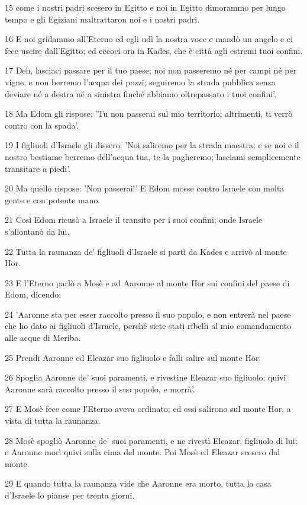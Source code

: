\par 15 come i nostri padri scesero in Egitto e noi in Egitto dimorammo per lungo tempo e gli Egiziani maltrattaron noi e i nostri padri.
\par 16 E noi gridammo all'Eterno ed egli udì la nostra voce e mandò un angelo e ci fece uscire dall'Egitto; ed eccoci ora in Kades, che è città agli estremi tuoi confini.
\par 17 Deh, lasciaci passare per il tuo paese; noi non passeremo né per campi né per vigne, e non berremo l'acqua dei pozzi; seguiremo la strada pubblica senza deviare né a destra né a sinistra finché abbiamo oltrepassato i tuoi confini'.
\par 18 Ma Edom gli rispose: 'Tu non passerai sul mio territorio; altrimenti, ti verrò contro con la spada'.
\par 19 I figliuoli d'Israele gli dissero: 'Noi saliremo per la strada maestra; e se noi e il nostro bestiame berremo dell'acqua tua, te la pagheremo; lasciami semplicemente transitare a piedi'.
\par 20 Ma quello rispose: 'Non passerai!' E Edom mosse contro Israele con molta gente e con potente mano.
\par 21 Così Edom ricusò a Israele il transito per i suoi confini; onde Israele s'allontanò da lui.
\par 22 Tutta la raunanza de' figliuoli d'Israele si partì da Kades e arrivò al monte Hor.
\par 23 E l'Eterno parlò a Mosè e ad Aaronne al monte Hor sui confini del paese di Edom, dicendo:
\par 24 'Aaronne sta per esser raccolto presso il suo popolo, e non entrerà nel paese che ho dato ai figliuoli d'Israele, perché siete stati ribelli al mio comandamento alle acque di Meriba.
\par 25 Prendi Aaronne ed Eleazar suo figliuolo e falli salire sul monte Hor.
\par 26 Spoglia Aaronne de' suoi paramenti, e rivestine Eleazar suo figliuolo; quivi Aaronne sarà raccolto presso il suo popolo, e morrà'.
\par 27 E Mosè fece come l'Eterno aveva ordinato; ed essi salirono sul monte Hor, a vista di tutta la raunanza.
\par 28 Mosè spogliò Aaronne de' suoi paramenti, e ne rivestì Eleazar, figliuolo di lui; e Aaronne morì quivi sulla cima del monte. Poi Mosè ed Eleazar scesero dal monte.
\par 29 E quando tutta la raunanza vide che Aaronne era morto, tutta la casa d'Israele lo pianse per trenta giorni.

